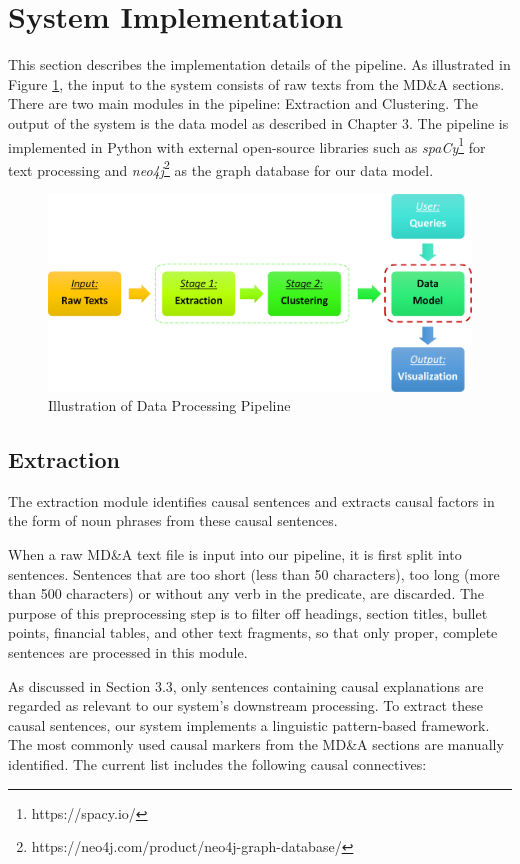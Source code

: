 \section{System Implementation} 
This section describes the implementation details of the pipeline. As illustrated in Figure \ref{fig:pipeline}, the input to the system consists of raw texts from the MD\&A sections. There are two main modules in the pipeline: Extraction and Clustering. The output of the system is the data model as described in Chapter 3. The pipeline is implemented in Python with external open-source libraries such as \emph{spaCy}\footnote{https://spacy.io/} for text processing and \emph{neo4j}\footnote{https://neo4j.com/product/neo4j-graph-database/} as the graph database for our data model. 

\begin{figure}[h!]
\centering
  \includegraphics[scale=1.4]{figures/Pipeline_0.png}
  \caption{Illustration of Data Processing Pipeline}
  \label{fig:pipeline}
\end{figure}


\subsection{Extraction}
The extraction module identifies causal sentences and extracts causal factors in the form of noun phrases from these causal sentences. 

When a raw MD\&A text file is input into our pipeline, it is first split into sentences. Sentences that are too short (less than 50 characters), too long (more than 500 characters) or without any verb in the predicate, are discarded. The purpose of this preprocessing step is to filter off headings, section titles, bullet points, financial tables, and other text fragments, so that only proper, complete sentences are processed in this module.

As discussed in Section 3.3, only sentences containing causal explanations are regarded as relevant to our system's downstream processing. To extract these causal sentences, our system implements a linguistic pattern-based framework. The most commonly used causal markers from the MD\&A sections are manually identified. The current list includes the following causal connectives: 

